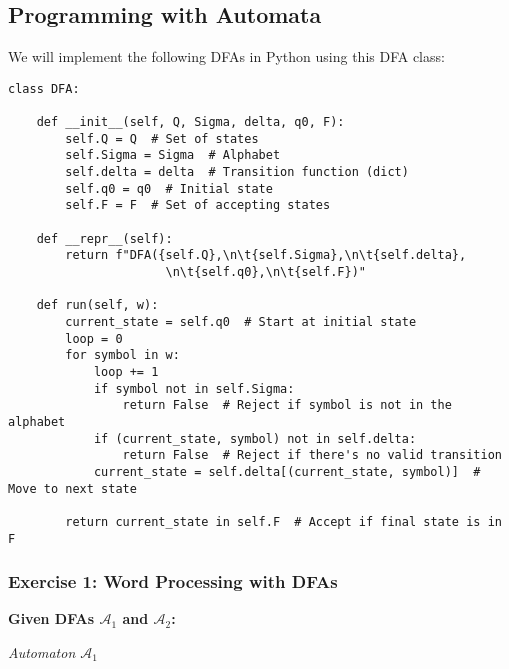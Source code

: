 \documentclass{article}
\begin{document}
\subsection{Programming with Automata}

We will implement the following DFAs in Python using this DFA class:

\begin{verbatim}
class DFA:

    def __init__(self, Q, Sigma, delta, q0, F):
        self.Q = Q  # Set of states
        self.Sigma = Sigma  # Alphabet
        self.delta = delta  # Transition function (dict)
        self.q0 = q0  # Initial state
        self.F = F  # Set of accepting states

    def __repr__(self):
        return f"DFA({self.Q},\n\t{self.Sigma},\n\t{self.delta},
                      \n\t{self.q0},\n\t{self.F})"

    def run(self, w):
        current_state = self.q0  # Start at initial state
        loop = 0
        for symbol in w:
            loop += 1
            if symbol not in self.Sigma:
                return False  # Reject if symbol is not in the alphabet
            if (current_state, symbol) not in self.delta:
                return False  # Reject if there's no valid transition
            current_state = self.delta[(current_state, symbol)]  # Move to next state
        
        return current_state in self.F  # Accept if final state is in F
\end{verbatim}

\subsubsection{Exercise 1: Word Processing with DFAs}

\textbf{Given DFAs $\mathcal{A}_1$ and $\mathcal{A}_2$:}

\begin{center}

\textit{Automaton $\mathcal{A}_1$}
\end{center}
\end{document}
